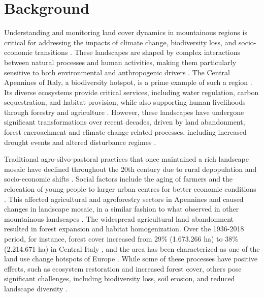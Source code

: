 \documentclass[remotesensing,article,submit,pdftex,moreauthors]{Definitions/mdpi}
\begin{document}
\section{Background}

Understanding and monitoring land cover dynamics in mountainous regions is critical for addressing the impacts of climate change, biodiversity loss, and socio-economic transitions \cite{VACCHIANO201757,BENGTSSON200039}. These landscapes are shaped by complex interactions between natural processes and human activities, making them particularly sensitive to both environmental and anthropogenic drivers \cite{LASANTA2017810,data7060074,BEBI201743}. The Central Apennines of Italy, a biodiversity hotspot, is a prime example of such a region \cite{Ogwu2024}. Its diverse ecosystems provide critical services, including water regulation, carbon sequestration, and habitat provision, while also supporting human livelihoods through forestry and agriculture \cite{VACCHIANO201757}. However, these landscapes have undergone significant transformations over recent decades, driven by land abandonment, forest encroachment and climate-change related processes, including increased drought events and altered disturbance regimes \cite{SEBASTIANI2024101329,Vitali,BEBI201743}.

Traditional agro-silvo-pastoral practices that once maintained a rich landscape mosaic have declined throughout the 20th century due to rural depopulation and socio-economic shifts \cite{Vitali}. Social factors include the aging of farmers and the relocation of young people to larger urban centres for better economic conditions \cite{MAREGGI2024103358,BRUNORI2007183}. This affected agricultural and agroforestry sectors in Apennines and caused changes in landscape mosaic, in a similar fashion to what observed in other mountainous landscapes \cite{LASANTA2017810,PERPINACASTILLO2021104946,geomatics5010005,Arnaez}. The widespread agricultural land abandonment resulted in forest expansion and habitat homogenization. Over the 1936-2018 period, for instance, forest cover increased from 29\% (1.673.266 ha) to 38\% (2.214.671 ha) in Central Italy \cite{AGNOLETTI2022119655}, and the area has been characterized as one of the land use change hotspots of Europe \cite{Kuemmerle_2016}. While some of these processes have positive effects, such as ecosystem restoration and increased forest cover, others pose significant challenges, including biodiversity loss, soil erosion, and reduced landscape diversity \cite{Falcucci,AMEZTEGUI2021104240}.
\end{document}
